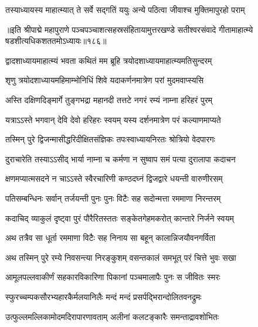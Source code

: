 \twolineshloka
{तस्याध्यायस्य माहात्म्यात् ते सर्वे सद्गतिं ययुः}
{अन्ये पठित्वा जीवाश्च मुक्तिमापुरहो पराम्} %

॥इति श्रीपाद्मे महापुराणे पञ्चपञ्चाशत्सहस्रसंहितायामुत्तरखण्डे सतीश्वरसंवादे गीतामाहात्म्ये षडशीत्यधिकशततमोऽध्यायः॥१८६॥

\genMangalaShloka

\closesub

\ganapatyadiDhyanam
\padmaPuranam



\twolineshloka
{द्वादशाध्यायमाहात्म्यं भवता कथितं मम}
{ब्रूहि त्रयोदशाध्यायमाहात्म्यमतिसुन्दरम्} %


\twolineshloka
{शृणु त्रयोदशाध्यायमहिमाम्भोनिधिं शिवे}
{यदाकर्णनमात्रेण परां मुदमवाप्स्यसि} %

\twolineshloka
{अस्ति दक्षिणदिङ्मार्गे तुङ्गभद्रा महानदी}
{तत्तटे नगरं रम्यं नाम्ना हरिहरं पुरम्} %

\twolineshloka
{यत्राऽऽस्ते भगवान् देवि देवो हरिहरः स्वयम्}
{यस्य दर्शनमात्रेण परं कल्याणमाप्यते} %

\twolineshloka
{तस्मिन् पुरे द्विजन्मासीद्धरिदीक्षितसंज्ञिकः}
{तपःस्वाध्यायनिरतः श्रोत्रियो वेदपारगः} %

\twolineshloka
{दुराचारेति तस्याऽऽसीद् भार्या नाम्ना च कर्मणा}
{न सुष्वाप समं पत्या दुरालापा कदाचन} %

\twolineshloka
{क्षणमप्यात्मसदने न चाऽऽस्ते स्वैरचारिणी}
{कण्ठदघ्नं द्विजद्वारे धयन्ती वारुणीरसम्} %

\twolineshloka
{पतिसम्बन्धिनः सर्वान् तर्जयन्ती पुनः पुनः}
{विटैः सह सदोन्मत्ता रममाणा निरन्तरम्} %

\twolineshloka
{कदाचिद् व्याकुलं दृष्ट्वा पुरं पौरैरितस्ततः}
{सङ्केतगेहमकरोत् कान्तारे निर्जने स्वयम्} %

\twolineshloka
{अथ तत्रैव सा धूर्ता रममाणा विटैः सह}
{निनाय सा बहून् कालान्निजयौवनगर्विता} %

\twolineshloka
{अथ तस्मिन् पुरे रम्ये निवसन्त्या निरङ्कुशम्}
{वसन्तकालं समभूत् परं चित्ते भुवः सखा} %

\twolineshloka
{आमूलपल्लवाकीर्णं सहकारविकारिणा}
{पिकानां पञ्चमालापैः पुनः स जीवितः स्मरः} %

\twolineshloka
{स्फुरच्चम्पकसौरभ्यहारकैर्मलयानिलैः}
{मन्दं मन्दं प्रसर्पद्भिरान्दोलितवनद्रुमः} %

\twolineshloka
{उत्फुल्लमल्लिकामोदमदिरापारणावताम्}
{अलीनां कलटङ्कारैः समन्ताद्रावशोभितः} %

